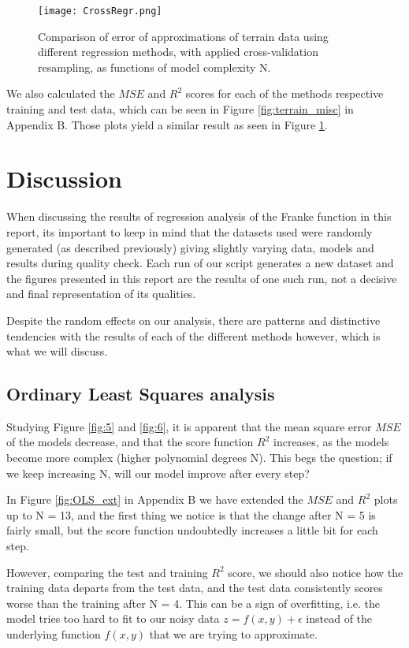 \documentclass[reprint,english,notitlepage]{revtex4-1}  %
\begin{document}
\begin{figure}[h!]
    \centering
    \texttt{[image: CrossRegr.png]}
    \caption{Comparison of error of approximations of terrain data using different regression methods, with applied cross-validation resampling, as functions of model complexity N.}
    \label{fig:terrain_analysis}
\end{figure}

We also calculated the $MSE$ and $R^2$ scores for each of the methods respective training and test data, which can be seen in Figure \ref{fig:terrain_misc} in Appendix B. Those plots yield a similar result as seen in Figure \ref{fig:terrain_analysis}.

\section{Discussion}

When discussing the results of regression analysis of the Franke function in this report, its important to keep in mind that the datasets used were randomly generated (as described previously) giving slightly varying data, models and results during quality check. Each run of our script generates a new dataset and the figures presented in this report are the results of one such run, not a decisive and final representation of its qualities.

Despite the random effects on our analysis, there are patterns and distinctive tendencies with the results of each of the different methods however, which is what we will discuss.

\subsection{Ordinary Least Squares analysis}

Studying Figure \ref{fig:5} and \ref{fig:6}, it is apparent that the mean square error $MSE$ of the models decrease, and that the score function $R^2$ increases, as the models become more complex (higher polynomial degrees N). This begs the question; if we keep increasing N, will our model improve after every step?

In Figure \ref{fig:OLS_ext} in Appendix B we have extended the $MSE$ and $R^2$ plots up to N = 13, and the first thing we notice is that the change after N = 5 is fairly small, but the score function undoubtedly increases a little bit for each step.

However, comparing the test and training $R^2$ score, we should also notice how the training data departs from the test data, and the test data consistently scores worse than the training after N = 4. This can be a sign of overfitting, i.e. the model tries too hard to fit to our noisy data $z = f(x,y) + \epsilon$ instead of the underlying function $f(x, y)$ that we are trying to approximate.
\end{document}
